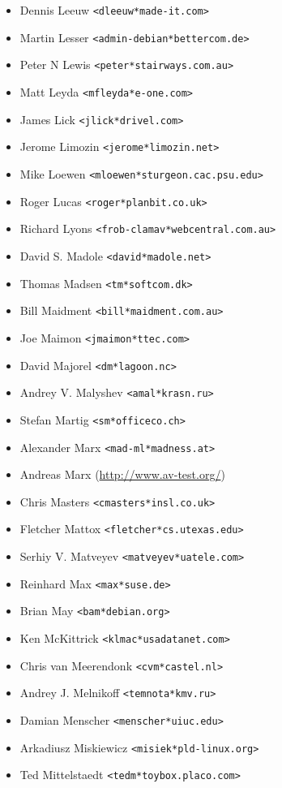 \documentclass[a4paper,titlepage,12pt]{article}
\newcommand{\email}[1]{\texttt{#1}}
\begin{document}
\begin{itemize}
	\item Dennis Leeuw \email{<dleeuw*made-it.com>}
	\item Martin Lesser \email{<admin-debian*bettercom.de>}
	\item Peter N Lewis \email{<peter*stairways.com.au>}
	\item Matt Leyda \email{<mfleyda*e-one.com>}
	\item James Lick \email{<jlick*drivel.com>}
	\item Jerome Limozin \email{<jerome*limozin.net>}
	\item Mike Loewen \email{<mloewen*sturgeon.cac.psu.edu>}
	\item Roger Lucas \email{<roger*planbit.co.uk>}
	\item Richard Lyons \email{<frob-clamav*webcentral.com.au>}
	\item David S. Madole \email{<david*madole.net>}
	\item Thomas Madsen \email{<tm*softcom.dk>}
	\item Bill Maidment \email{<bill*maidment.com.au>}
	\item Joe Maimon \email{<jmaimon*ttec.com>}
	\item David Majorel \email{<dm*lagoon.nc>}
	\item Andrey V. Malyshev \email{<amal*krasn.ru>}
	\item Stefan Martig \email{<sm*officeco.ch>}
	\item Alexander Marx \email{<mad-ml*madness.at>}
	\item Andreas Marx (\url{http://www.av-test.org/})
	\item Chris Masters \email{<cmasters*insl.co.uk>}
	\item Fletcher Mattox \email{<fletcher*cs.utexas.edu>}
	\item Serhiy V. Matveyev \email{<matveyev*uatele.com>}
	\item Reinhard Max \email{<max*suse.de>}
	\item Brian May \email{<bam*debian.org>}
	\item Ken McKittrick \email{<klmac*usadatanet.com>}
	\item Chris van Meerendonk \email{<cvm*castel.nl>}
	\item Andrey J. Melnikoff \email{<temnota*kmv.ru>}
	\item Damian Menscher \email{<menscher*uiuc.edu>}
	\item Arkadiusz Miskiewicz \email{<misiek*pld-linux.org>}
	\item Ted Mittelstaedt \email{<tedm*toybox.placo.com>}

\end{itemize}
\end{document}

